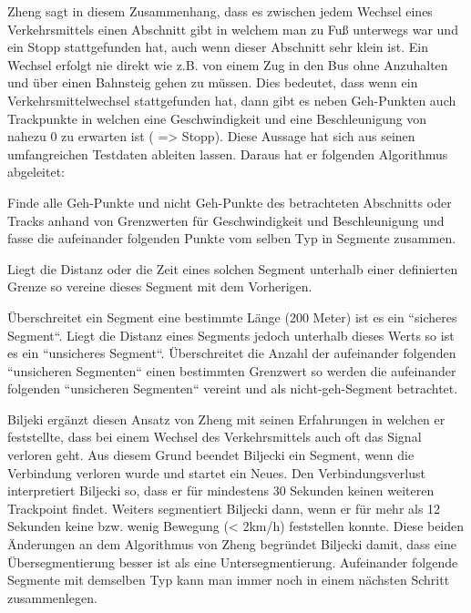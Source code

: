 Zheng sagt in diesem Zusammenhang, dass es zwischen jedem Wechsel eines Verkehrsmittels einen Abschnitt gibt in welchem man zu Fuß unterwegs war und ein Stopp stattgefunden hat, auch wenn dieser Abschnitt sehr klein ist. Ein Wechsel erfolgt nie direkt wie z.B. von einem Zug in den Bus ohne Anzuhalten und über einen Bahnsteig gehen zu müssen. Dies bedeutet, dass wenn ein Verkehrsmittelwechsel stattgefunden hat, dann gibt es neben Geh-Punkten auch Trackpunkte in welchen eine Geschwindigkeit und eine Beschleunigung von nahezu 0 zu erwarten ist ( => Stopp).  Diese Aussage hat sich aus seinen umfangreichen Testdaten ableiten lassen. Daraus hat er folgenden Algorithmus abgeleitet:  \cite{zheng_understanding_2010}

\begin{pitemize}
\item Finde alle Geh-Punkte und nicht Geh-Punkte des betrachteten Abschnitts oder Tracks anhand von Grenzwerten für Geschwindigkeit und Beschleunigung und fasse die aufeinander folgenden Punkte vom selben Typ in Segmente zusammen.
\item Liegt die Distanz oder die Zeit eines solchen Segment unterhalb einer definierten Grenze so vereine dieses Segment mit dem Vorherigen.
\item Überschreitet ein Segment eine bestimmte Länge (200 Meter) ist es ein ``sicheres Segment``. Liegt die Distanz eines Segments jedoch unterhalb dieses Werts so ist es ein ``unsicheres Segment``. Überschreitet die Anzahl der aufeinander folgenden ``unsicheren Segmenten`` einen bestimmten Grenzwert so werden die  aufeinander folgenden ``unsicheren Segmenten`` vereint und als nicht-geh-Segment betrachtet.
\end{pitemize}

Biljeki ergänzt diesen Ansatz von Zheng mit seinen Erfahrungen in welchen er feststellte, dass bei einem Wechsel des Verkehrsmittels auch oft das Signal verloren geht. Aus diesem Grund beendet Biljecki ein Segment, wenn die Verbindung verloren wurde und startet ein Neues. Den Verbindungsverlust interpretiert Biljecki so, dass er für mindestens 30 Sekunden keinen weiteren Trackpoint findet. Weiters segmentiert Biljecki dann, wenn er für mehr als 12 Sekunden keine bzw. wenig Bewegung (< 2km/h) feststellen konnte. Diese beiden Änderungen an dem Algorithmus von Zheng begründet Biljecki damit, dass eine Übersegmentierung besser ist als eine Untersegmentierung. Aufeinander folgende Segmente mit demselben Typ kann man immer noch in einem nächsten Schritt zusammenlegen. \cite{biljecki_transportation_2013}

